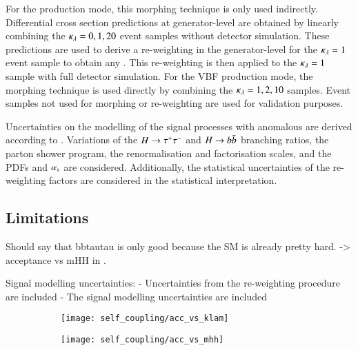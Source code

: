 For the \ggF production mode, this morphing technique is only used
indirectly. Differential cross section predictions at generator-level
are obtained by linearly combining the $\kappa_{\lambda} = 0, 1, 20$ event
samples without detector simulation. These predictions are used to
derive a re-weighting in the generator-level \mHH for the
$\kappa_{\lambda} = 1$ event sample to obtain any \klambda. This re-weighting
is then applied to the $\kappa_{\lambda} = 1$ sample with full detector
simulation. For the VBF production mode, the morphing technique is
used directly by combining the $\kappa_{\lambda} = 1, 2, 10$ samples. Event
samples not used for morphing or re-weighting are used for validation
purposes.

Uncertainties on the modelling of the signal processes with anomalous
\klambda are derived according to .
Variations of the $H \to \tau^{+} \tau^{-}$ and $H \to b\bar{b}$ branching ratios,
the parton shower program, the renormalisation and factorisation
scales, and the PDFs and $\alpha_{\text{s}}$ are considered. Additionally, the
statistical uncertainties of the \klambda re-weighting factors are
considered in the statistical interpretation.


\subsection{Limitations}%
\label{sec:self_coupling_bbtt_limitations}



Should say that bbtautau is only good because the SM is already pretty
hard. -> acceptance vs mHH in \hadhad.


Signal modelling uncertainties:
- Uncertainties from the re-weighting procedure are included
- The signal modelling uncertainties are included

\begin{figure}[htbp]
  \centering

  \begin{subfigure}[t]{0.485\textwidth}
    \texttt{[image: self\_coupling/acc\_vs\_klam]}
    \subcaption{}
  \end{subfigure}\hfill%
  \begin{subfigure}[t]{0.485\textwidth}
    \texttt{[image: self\_coupling/acc\_vs\_mhh]}
    \subcaption{}
  \end{subfigure}

  \caption{}%
  \label{fig:acceptance_vs_klambda}
\end{figure}


